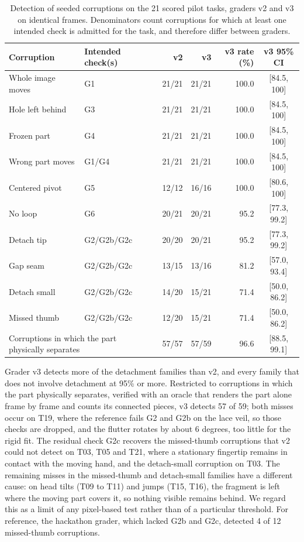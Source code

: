\documentclass[11pt]{article}
\newcommand{\ci}[2]{\,[#1,\,#2]}
\newcommand{\chk}[1]{\textsf{#1}}
\begin{document}
\begin{table}[t]
\centering
\small
\setlength{\tabcolsep}{4pt}
\begin{tabular}{llrrrc}
\toprule
Corruption & Intended check(s) & v2 & v3 & v3 rate (\%) & v3 95\% CI \\
\midrule
Whole image moves & \chk{G1} & 21/21 & 21/21 & 100.0 & \ci{84.5}{100} \\
Hole left behind & \chk{G3} & 21/21 & 21/21 & 100.0 & \ci{84.5}{100} \\
Frozen part & \chk{G4} & 21/21 & 21/21 & 100.0 & \ci{84.5}{100} \\
Wrong part moves & \chk{G1}/\chk{G4} & 21/21 & 21/21 & 100.0 & \ci{84.5}{100} \\
Centered pivot & \chk{G5} & 12/12 & 16/16 & 100.0 & \ci{80.6}{100} \\
No loop & \chk{G6} & 20/21 & 20/21 & 95.2 & \ci{77.3}{99.2} \\
Detach tip & \chk{G2}/\chk{G2b}/\chk{G2c} & 20/20 & 20/21 & 95.2 & \ci{77.3}{99.2} \\
Gap seam & \chk{G2}/\chk{G2b}/\chk{G2c} & 13/15 & 13/16 & 81.2 & \ci{57.0}{93.4} \\
Detach small & \chk{G2}/\chk{G2b}/\chk{G2c} & 14/20 & 15/21 & 71.4 & \ci{50.0}{86.2} \\
Missed thumb & \chk{G2}/\chk{G2b}/\chk{G2c} & 12/20 & 15/21 & 71.4 & \ci{50.0}{86.2} \\
\midrule
\multicolumn{2}{l}{Corruptions in which the part physically separates} & 57/57 & 57/59 & 96.6 & \ci{88.5}{99.1} \\
\bottomrule
\end{tabular}
\caption{Detection of seeded corruptions on the 21 scored pilot tasks, graders v2 and v3 on identical frames. Denominators count corruptions for which at least one intended check is admitted for the task, and therefore differ between graders.}
\label{tab:detect}
\end{table}

Grader v3 detects more of the detachment families than v2, and every family that does not involve detachment at 95\% or more. Restricted to corruptions in which the part physically separates, verified with an oracle that renders the part alone frame by frame and counts its connected pieces, v3 detects 57 of 59; both misses occur on T19, where the reference fails \chk{G2} and \chk{G2b} on the lace veil, so those checks are dropped, and the flutter rotates by about 6 degrees, too little for the rigid fit. The residual check \chk{G2c} recovers the missed-thumb corruptions that v2 could not detect on T03, T05 and T21, where a stationary fingertip remains in contact with the moving hand, and the detach-small corruption on T03. The remaining misses in the missed-thumb and detach-small families have a different cause: on head tilts (T09 to T11) and jumps (T15, T16), the fragment is left where the moving part covers it, so nothing visible remains behind. We regard this as a limit of any pixel-based test rather than of a particular threshold. For reference, the hackathon grader, which lacked \chk{G2b} and \chk{G2c}, detected 4 of 12 missed-thumb corruptions.
\end{document}
